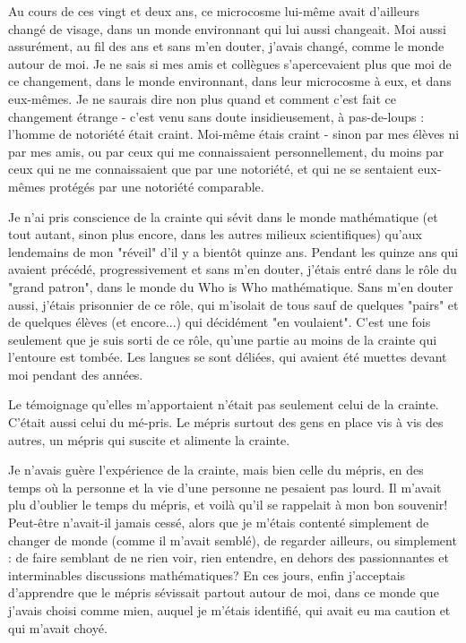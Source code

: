 Au cours de ces vingt et deux ans, ce microcosme lui-même avait d'ailleurs changé de visage, dans un monde environnant qui lui aussi changeait. Moi aussi assurément, au fil des ans et sans m'en douter, j'avais changé, comme le monde autour de moi. Je ne sais si mes amis et collègues s'apercevaient plus que moi de ce changement, dans le monde environnant, dans leur microcosme à eux, et dans eux-mêmes. Je ne saurais dire non plus quand et comment c'est fait ce changement étrange - c'est venu sans doute insidieusement, à pas-de-loups : l'homme de notoriété était craint. Moi-même étais craint - sinon par mes élèves ni par mes amis, ou par ceux qui me connaissaient personnellement, du moins par ceux qui ne me connaissaient que par une notoriété, et qui ne se sentaient eux-mêmes protégés par une notoriété comparable.

Je n'ai pris conscience de la crainte qui sévit dans le monde mathématique (et tout autant, sinon plus encore, dans les autres milieux scientifiques) qu'aux lendemains de mon "réveil" d'il y a bientôt quinze ans. Pendant les quinze ans qui avaient précédé, progressivement et sans m'en douter, j'étais entré dans le rôle du "grand patron", dans le monde du Who is Who mathématique. Sans m'en douter aussi, j'étais prisonnier de ce rôle, qui m’isolait de tous sauf de quelques "pairs" et de quelques élèves (et encore...) qui décidément "en voulaient". C'est une fois seulement que je suis sorti de ce rôle, qu'une partie au moins de la crainte qui l'entoure est tombée. Les langues se sont déliées, qui avaient été muettes devant moi pendant des années.

Le témoignage qu'elles m'apportaient n'était pas seulement celui de la crainte. C'était aussi celui du mé-pris. Le mépris surtout des gens en place vis à vis des autres, un mépris qui suscite et alimente la crainte.

Je n'avais guère l'expérience de la crainte, mais bien celle du mépris, en des temps où la personne et la vie d'une personne ne pesaient pas lourd. Il m'avait plu d'oublier le temps du mépris, et voilà qu'il se rappelait à mon bon souvenir! Peut-être n'avait-il jamais cessé, alors que je m'étais contenté simplement de changer de monde (comme il m'avait semblé), de regarder ailleurs, ou simplement : de faire semblant de ne rien voir, rien entendre, en dehors des passionnantes et interminables discussions mathématiques? En ces jours, enfin j'acceptais d'apprendre que le mépris sévissait partout autour de moi, dans ce monde que j'avais choisi comme mien, auquel je m'étais identifié, qui avait eu ma caution et qui m'avait choyé.

